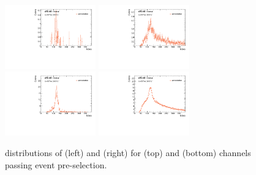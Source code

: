 \begin{figure}[htbp]
  \centering
 \includegraphics[width=0.35\textwidth]{figures/VBF/Mbb_VH_2cen.pdf}
 \includegraphics[width=0.35\textwidth]{figures/VBF/Mbb_ttH_2cen.pdf}\\
 \includegraphics[width=0.35\textwidth]{figures/VBF/Mbb_VH_4cen.pdf}
 \includegraphics[width=0.35\textwidth]{figures/VBF/Mbb_ttH_4cen.pdf}
 \caption{\Mbb distributions of \VH (left) and \ttH (right) for \twocentral (top) and \fourcentral (bottom) channels passing event pre-selection. }
  \label{fig:Mbb-ttH-VH}
\end{figure}

